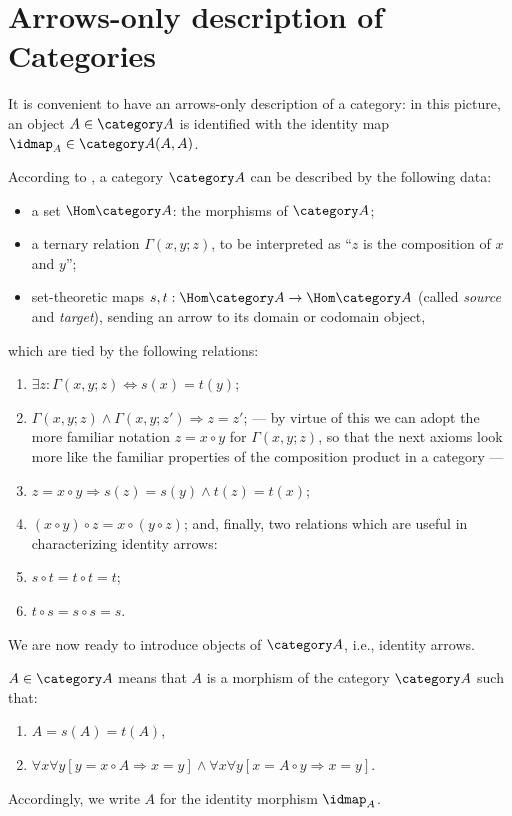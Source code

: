

\chapter{Arrows-only description of Categories}
\label{cha:arrows}

It is convenient to have an arrows-only description of a category: in
this picture, an object $A \in \A$ is identified with the identity map
$\idmap_A \in \A(A, A)$.

According to \cite{lawvere;1965}, a category $\A$ can be described by
the following data:
\begin{itemize}
\item a set $\Hom\A$: the morphisms of $\A$;
\item a ternary relation $\Gamma(x,y;z)$, to be interpreted as ``$z$ is
  the composition of $x$ and $y$'';
\item set-theoretic maps $s,t: \Hom\A \to \Hom\A$ (called \emph{source}
  and \emph{target}), sending an arrow to its domain or codomain
  object,
\end{itemize}
which are tied by the following relations:
\begin{enumerate}
\item $\exists z: \Gamma(x,y;z) \Leftrightarrow s(x) = t(y)$; \label{item:A1}
\item $\Gamma(x,y;z) \land \Gamma(x,y;z') \Rightarrow z = z'$;
--- by virtue of this we can adopt the more familiar notation $z = x\circ
y$ for $\Gamma(x,y; z)$, so that the next axioms look more like the
familiar properties of the composition product in a category ---
\item $z = x\circ y \Rightarrow s(z) = s(y) \land t(z) = t(x)$;
\item $(x\circ y) \circ z = x \circ (y \circ z)$;
and, finally, two relations which are useful in characterizing
identity arrows:
\item $s \circ t = t \circ t = t$;
\item $t \circ s = s \circ s = s$.
\end{enumerate}

We are now ready to introduce objects of $\A$, i.e., identity
arrows. 
\begin{definition}\label{dfn:object}
  $A\in \A$ means that $A$ is a morphism of the category $\A$
  such that:
  \begin{enumerate}
  \item $A = s(A) = t(A)$, \label{item:AO1}
  \item $\forall x\forall y[ y = x \circ A \Rightarrow x = y] \land \forall x\forall y [
    x = A \circ y \Rightarrow x = y]$. \label{item:AO2} 
  \end{enumerate}
\end{definition}
Accordingly, we write $A$ for the identity morphism $\idmap_A$.

